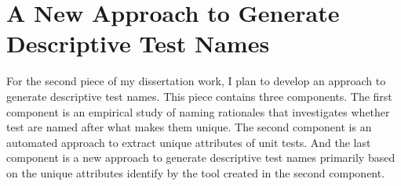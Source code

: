 \section{A New Approach to Generate Descriptive Test Names}
\label{sec:generate-names}

For the second piece of my dissertation work, I plan to develop an approach to generate descriptive test names.
%
This piece contains three components.
%
The first component is an empirical study of naming rationales that investigates whether test are named after what makes them unique.
%
The second component is an automated approach to extract unique attributes of unit tests.
%
And the last component is a new approach to generate descriptive test names primarily based on the unique attributes identify by the tool created in the second component.